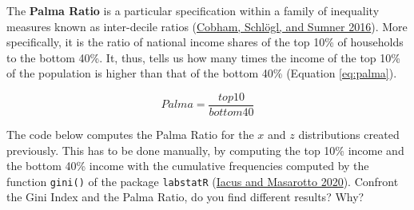 \documentclass[
]{svmono}
\begin{document}
The \textbf{Palma Ratio} is a particular specification within a family of
inequality measures known as inter-decile ratios (\protect\hyperlink{ref-cobham2016}{Cobham, Schlögl, and Sumner 2016}). More
specifically, it is the ratio of national income shares of the top 10\%
of households to the bottom 40\%. It, thus, tells us how many times the
income of the top 10\% of the population is higher than that of the
bottom 40\% (Equation \eqref{eq:palma}).

\begin{equation}
Palma = \frac {top10}{bottom40}
\label{eq:palma}
\end{equation}

The code below computes the Palma Ratio for the \(x\) and \(z\)
distributions created previously. This has to be done manually, by
computing the top 10\% income and the bottom 40\% income with the
cumulative frequencies computed by the function \texttt{gini()} of the package
\texttt{labstatR} (\protect\hyperlink{ref-iacus2020}{Iacus and Masarotto 2020}). Confront the Gini Index and the Palma Ratio, do
you find different results? Why?
\end{document}
